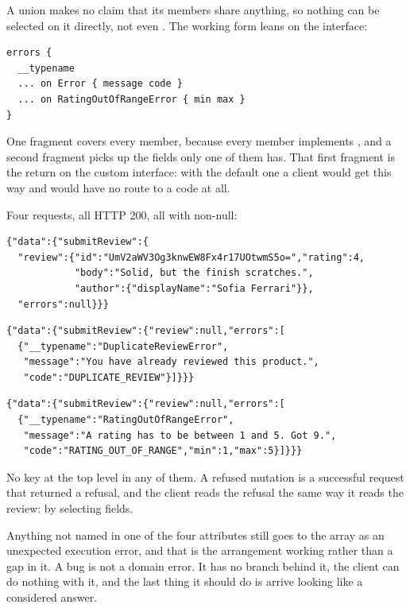 A union makes no claim that its members share anything, so nothing can be
selected on it directly, not even . The working form leans on the
interface:

\begin{verbatim}
errors {
  __typename
  ... on Error { message code }
  ... on RatingOutOfRangeError { min max }
}
\end{verbatim}

One fragment covers every member, because every member implements ,
and a second fragment picks up the fields only one of them has. That first
fragment is the return on the custom interface: with the default one a client
would get  this way and would have no route to a code at all.

Four requests, all HTTP 200, all with  non-null:

\begin{verbatim}
{"data":{"submitReview":{
  "review":{"id":"UmV2aWV3Og3knwEW8Fx4r17UOtwmS5o=","rating":4,
            "body":"Solid, but the finish scratches.",
            "author":{"displayName":"Sofia Ferrari"}},
  "errors":null}}}
\end{verbatim}

\begin{verbatim}
{"data":{"submitReview":{"review":null,"errors":[
  {"__typename":"DuplicateReviewError",
   "message":"You have already reviewed this product.",
   "code":"DUPLICATE_REVIEW"}]}}}
\end{verbatim}

\begin{verbatim}
{"data":{"submitReview":{"review":null,"errors":[
  {"__typename":"RatingOutOfRangeError",
   "message":"A rating has to be between 1 and 5. Got 9.",
   "code":"RATING_OUT_OF_RANGE","min":1,"max":5}]}}}
\end{verbatim}

No  key at the top level in any of them. A refused mutation is a
successful request that returned a refusal, and the client reads the refusal the
same way it reads the review: by selecting fields.

%
Anything not named in one of the four attributes still goes to the array as an
unexpected execution error, and that is the arrangement working rather than a
gap in it. A bug is not a domain error. It has no branch behind it, the client
can do nothing with it, and the last thing it should do is arrive looking like a
considered answer.

